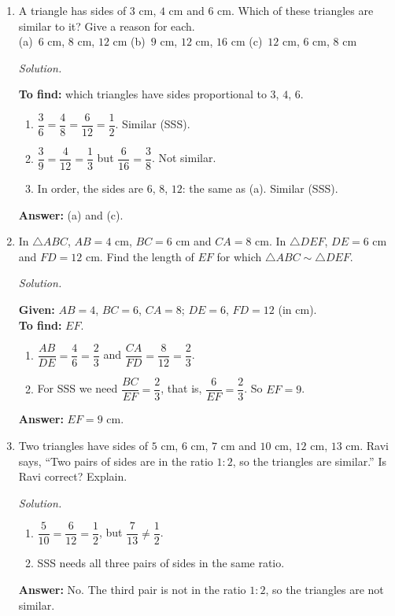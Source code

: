 \documentclass[11pt,a4paper]{article}
\theoremstyle{branddef}
\newcommand{\tr}{\triangle}
\newenvironment{exercise}[1]
  {\par\medskip\Needspace{7\baselineskip}\noindent{\large\bfseries Exercise #1}
   \par\smallskip
   \begin{enumerate}[leftmargin=*,itemsep=4pt]}
  {\end{enumerate}}
\newenvironment{solution}
  {\par\smallskip\begingroup\small\linespread{1.15}\selectfont\color{muted}\noindent\textit{Solution.}\par}
  {\par\endgroup\smallskip}
\newenvironment{steps}{\begin{enumerate}[label=\arabic*.,leftmargin=1.5em,itemsep=0pt,topsep=2pt]}{\end{enumerate}}
\begin{document}
\begin{exercise}{3B}
\item A triangle has sides of $3$ cm, $4$ cm and $6$ cm. Which of these triangles are similar to it? Give a reason for each.\\
(a)~$6$ cm, $8$ cm, $12$ cm \quad (b)~$9$ cm, $12$ cm, $16$ cm \quad (c)~$12$ cm, $6$ cm, $8$ cm
\begin{solution}
\textbf{To find:} which triangles have sides proportional to $3$, $4$, $6$.
\begin{steps}
  \item[(a)] $\dfrac36=\dfrac48=\dfrac{6}{12}=\dfrac12$. Similar (SSS).
  \item[(b)] $\dfrac39=\dfrac{4}{12}=\dfrac13$ but $\dfrac{6}{16}=\dfrac38$. Not similar.
  \item[(c)] In order, the sides are $6$, $8$, $12$: the same as (a). Similar (SSS).
\end{steps}
\textbf{Answer:} (a) and (c).
\end{solution}

\item In $\tr ABC$, $AB=4$ cm, $BC=6$ cm and $CA=8$ cm. In $\tr DEF$, $DE=6$ cm and $FD=12$ cm. Find the length of $EF$ for which $\tr ABC\sim\tr DEF$.
\begin{solution}
\textbf{Given:} $AB=4$, $BC=6$, $CA=8$; $DE=6$, $FD=12$ (in cm).\\
\textbf{To find:} $EF$.
\begin{steps}
  \item $\dfrac{AB}{DE}=\dfrac46=\dfrac23$ and $\dfrac{CA}{FD}=\dfrac{8}{12}=\dfrac23$.
  \item For SSS we need $\dfrac{BC}{EF}=\dfrac23$, that is, $\dfrac{6}{EF}=\dfrac23$. So $EF=9$.
\end{steps}
\textbf{Answer:} $EF=9$ cm.
\end{solution}

\item Two triangles have sides of $5$ cm, $6$ cm, $7$ cm and $10$ cm, $12$ cm, $13$ cm. Ravi says, ``Two pairs of sides are in the ratio $1:2$, so the triangles are similar.'' Is Ravi correct? Explain.
\begin{solution}
\begin{steps}
  \item $\dfrac{5}{10}=\dfrac{6}{12}=\dfrac12$, but $\dfrac{7}{13}\neq\dfrac12$.
  \item SSS needs all three pairs of sides in the same ratio.
\end{steps}
\textbf{Answer:} No. The third pair is not in the ratio $1:2$, so the triangles are not similar.
\end{solution}


\end{exercise}
\end{document}
